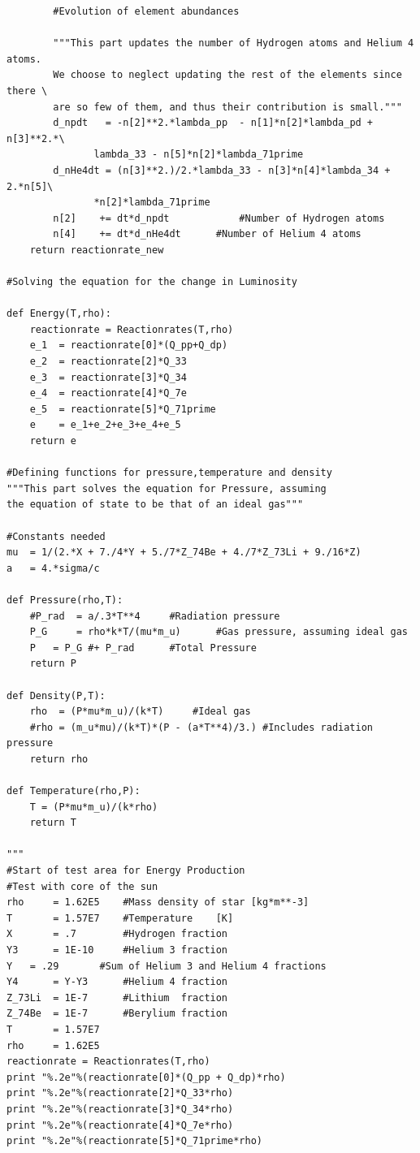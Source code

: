 \documentclass[a4paper,12pt]{article}
\begin{document}
\begin{verbatim}
		#Evolution of element abundances

		"""This part updates the number of Hydrogen atoms and Helium 4 atoms.
		We choose to neglect updating the rest of the elements since there \
		are so few of them, and thus their contribution is small."""
		d_npdt   = -n[2]**2.*lambda_pp 	- n[1]*n[2]*lambda_pd + n[3]**2.*\
			   lambda_33 - n[5]*n[2]*lambda_71prime
		d_nHe4dt = (n[3]**2.)/2.*lambda_33 - n[3]*n[4]*lambda_34 + 2.*n[5]\
			   *n[2]*lambda_71prime 
		n[2] 	+= dt*d_npdt 	    	#Number of Hydrogen atoms
		n[4] 	+= dt*d_nHe4dt   	#Number of Helium 4 atoms
	return reactionrate_new

#Solving the equation for the change in Luminosity

def Energy(T,rho):
	reactionrate = Reactionrates(T,rho)
	e_1  = reactionrate[0]*(Q_pp+Q_dp)
	e_2  = reactionrate[2]*Q_33
	e_3  = reactionrate[3]*Q_34
	e_4  = reactionrate[4]*Q_7e
	e_5  = reactionrate[5]*Q_71prime
	e    = e_1+e_2+e_3+e_4+e_5
	return e

#Defining functions for pressure,temperature and density
"""This part solves the equation for Pressure, assuming 
the equation of state to be that of an ideal gas"""

#Constants needed
mu 	= 1/(2.*X + 7./4*Y + 5./7*Z_74Be + 4./7*Z_73Li + 9./16*Z)
a 	= 4.*sigma/c

def Pressure(rho,T):
	#P_rad 	= a/.3*T**4		#Radiation pressure
	P_G 	= rho*k*T/(mu*m_u)    	#Gas pressure, assuming ideal gas
	P	= P_G #+ P_rad 		#Total Pressure
	return P

def Density(P,T):
	rho  = (P*mu*m_u)/(k*T)		#Ideal gas
	#rho = (m_u*mu)/(k*T)*(P - (a*T**4)/3.)	#Includes radiation pressure
	return rho

def Temperature(rho,P):
	T = (P*mu*m_u)/(k*rho)
	return T

"""
#Start of test area for Energy Production
#Test with core of the sun
rho     = 1.62E5    #Mass density of star [kg*m**-3]
T       = 1.57E7    #Temperature    [K]
X       = .7        #Hydrogen fraction
Y3      = 1E-10     #Helium 3 fraction
Y 	= .29 	    #Sum of Helium 3 and Helium 4 fractions
Y4      = Y-Y3      #Helium 4 fraction
Z_73Li  = 1E-7      #Lithium  fraction
Z_74Be  = 1E-7      #Berylium fraction
T   	= 1.57E7
rho 	= 1.62E5
reactionrate = Reactionrates(T,rho)
print "%.2e"%(reactionrate[0]*(Q_pp + Q_dp)*rho)
print "%.2e"%(reactionrate[2]*Q_33*rho)
print "%.2e"%(reactionrate[3]*Q_34*rho)
print "%.2e"%(reactionrate[4]*Q_7e*rho)
print "%.2e"%(reactionrate[5]*Q_71prime*rho)


\end{verbatim}
\end{document}
